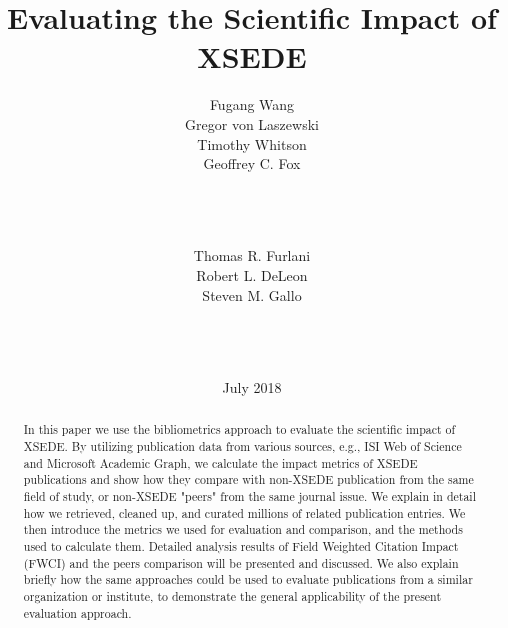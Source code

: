 \documentclass{sig-alternate}
\newcommand{\TITLE}{Evaluating the Scientific Impact of XSEDE}
\begin{document}

\title{\TITLE\vspace{-12pt}}

\author{ 
\alignauthor 
Fugang Wang\\ \vspace{2pt}
Gregor von Laszewski\\ \vspace{2pt}
Timothy Whitson\\ \vspace{2pt}
Geoffrey C. Fox\\ \vspace{6pt}
       \\ 
       \\ 
       \\ 
\and
\alignauthor  
Thomas R. Furlani\\ \vspace{2pt}
Robert L. DeLeon\\ \vspace{2pt}
Steven M. Gallo\\ \vspace{6pt}
       \\
       \\ 
       \\ 
}

\date{July 2018}

\maketitle

\begin{abstract}

In this paper we use the bibliometrics approach to evaluate the scientific impact of XSEDE.
By utilizing publication data from various sources, e.g., ISI Web of Science and
Microsoft Academic Graph, we calculate the impact metrics of XSEDE publications
and show how they compare with non-XSEDE publication from the same field of study, or non-XSEDE "peers"
from the same journal issue. We explain in detail how we retrieved, cleaned up,
and curated millions of related publication entries.
We then introduce the metrics we used for evaluation and comparison, and the methods
used to calculate them. Detailed analysis results of Field Weighted Citation Impact (FWCI)
and the peers comparison will be presented and discussed. We also explain briefly how the same
approaches could be used to evaluate publications from a similar organization or
institute, to demonstrate the general applicability of the present
evaluation approach.


\end{abstract}
\end{document}
